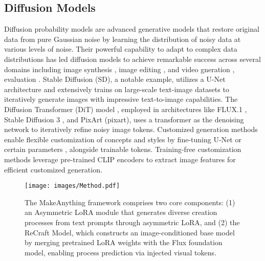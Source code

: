 \subsection{Diffusion Models}
Diffusion probability models \citep{ddim,ddpm} are advanced generative models that restore original data from pure Gaussian noise by learning the distribution of noisy data at various levels of noise. Their powerful capability to adapt to complex data distributions has led diffusion models to achieve remarkable success across several domains including image synthesis \citep{rombach2022high,dit}, image editing \citep{instructpix2pix,p2p,stablemakeup,stablehair}, and video gneration \citep{animatediff, svd, processpainter}, evaluation \citep{diffsim}. Stable Diffusion \citep{rombach2022high} (SD), a notable example, utilizes a U-Net architecture and extensively trains on large-scale text-image datasets to iteratively generate images with impressive text-to-image capabilities. The Diffusion Transformer (DiT) model \cite{dit}, employed in architectures like FLUX.1 \cite{flux}, Stable Diffusion 3 \cite{sd3}, and PixArt (pixart), uses a transformer as the denoising network to iteratively refine noisy image tokens. Customized generation methods enable flexible customization of concepts and styles by fine-tuning U-Net \citep{dreambooth} or certain parameters \citep{lora, customdiffusion}, alongside trainable tokens. Training-free customization methods \citep{ipa, ssr, fast} leverage pre-trained CLIP \citep{clip} encoders to extract image features for efficient customized generation. 


\begin{figure*}[htp]
    \centering
    \texttt{[image: images/Method.pdf]}
    \vspace{-6mm}
    \caption{The MakeAnything framework comprises two core components: (1) an Asymmetric LoRA module that generates diverse creation processes from text prompts through asymmetric LoRA, and (2) the ReCraft Model, which constructs an image-conditioned base model by merging pretrained LoRA weights with the Flux foundation model, enabling process prediction via injected visual tokens.}
    \label{fig2}
\end{figure*}
\vspace{-5mm}

